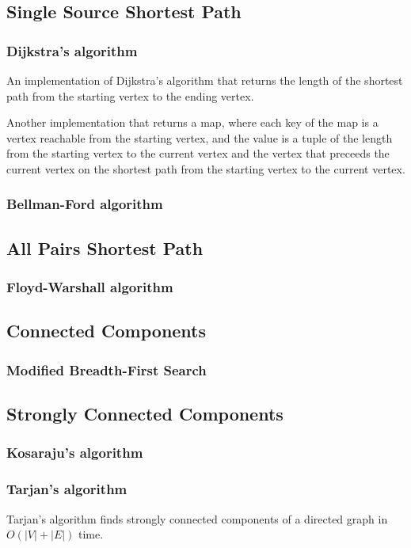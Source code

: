 \documentclass[11pt,a4paper,titlepage]{article}
\begin{document}
		\subsection{Single Source Shortest Path}
			\subsubsection{Dijkstra's algorithm}
				An implementation of Dijkstra's algorithm that returns the length of the shortest path from the starting vertex to the ending vertex.
				

				Another implementation that returns a map, where each key of the map is a vertex reachable from the starting vertex, and the value is a tuple of the length from the starting vertex to the current vertex and the vertex that preceeds the current vertex on the shortest path from the starting vertex to the current vertex.
				
			\subsubsection{Bellman-Ford algorithm}
		\subsection{All Pairs Shortest Path}
			\subsubsection{Floyd-Warshall algorithm}
		\subsection{Connected Components}
			\subsubsection{Modified Breadth-First Search}
		\subsection{Strongly Connected Components}
			\subsubsection{Kosaraju's algorithm}
			\subsubsection{Tarjan's algorithm}
				Tarjan's algorithm finds strongly connected components of a directed graph in $O(|V|+|E|)$ time.
				
\end{document}

